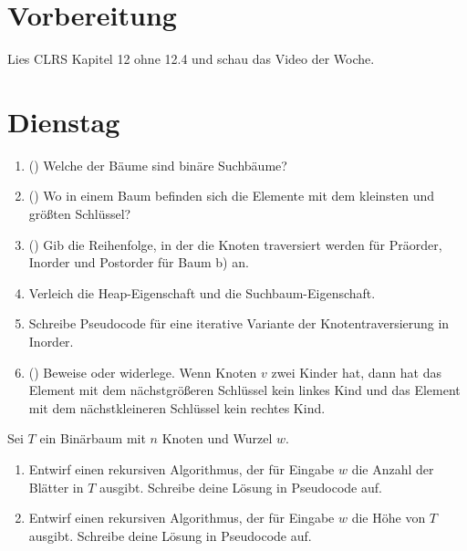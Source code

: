 \documentclass{uebung_cs}
\begin{document}
\section*{Vorbereitung}
Lies CLRS Kapitel 12 ohne 12.4 und schau das Video der Woche.

\section*{Dienstag}
\begin{aufgabe}[Binärbaumeigenschaften]\label{tue-first}\mbox{}
	\begin{enumerate}
		\item (\warmup) Welche der Bäume sind binäre Suchbäume?
		\item (\warmup) Wo in einem Baum befinden sich die Elemente mit dem kleinsten und größten Schlüssel?
		\item (\warmup) Gib die Reihenfolge, in der die Knoten traversiert werden für Präorder, Inorder und Postorder für Baum b) an.
		\item Verleich die Heap-Eigenschaft und die Suchbaum-Eigenschaft.
		\item Schreibe Pseudocode für eine iterative Variante der Knotentraversierung in Inorder.
		\item (\hard) Beweise oder widerlege.
		Wenn Knoten $v$ zwei Kinder hat, dann hat das Element mit dem nächstgrößeren Schlüssel kein linkes Kind und das Element mit dem nächstkleineren Schlüssel kein rechtes Kind.
	\end{enumerate}
\end{aufgabe}

\begin{aufgabe}
	Sei $T$ ein Binärbaum mit $n$ Knoten und Wurzel $w$.
	\begin{enumerate}
		\item Entwirf einen rekursiven Algorithmus, der für Eingabe $w$ die Anzahl der Blätter in $T$ ausgibt.
		Schreibe deine Lösung in Pseudocode auf.
		\item Entwirf einen rekursiven Algorithmus, der für Eingabe $w$ die Höhe von $T$ ausgibt.
		Schreibe deine Lösung in Pseudocode auf.
	\end{enumerate}
\end{aufgabe}
\end{document}
